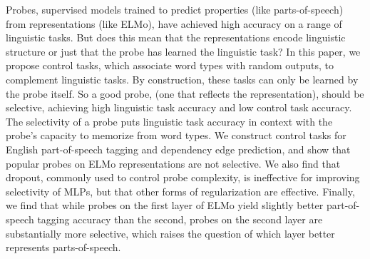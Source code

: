 Probes, supervised models trained to predict properties (like parts-of-speech) from representations (like ELMo), have achieved high accuracy on a range of linguistic tasks. But does this mean that the representations encode linguistic structure or just that the probe has learned the linguistic task? In this paper, we propose control tasks, which associate word types with random outputs, to complement linguistic tasks. By construction, these tasks can only be learned by the probe itself. So a good probe, (one that reflects the representation), should be selective, achieving high linguistic task accuracy and low control task accuracy. The selectivity of a probe puts linguistic task accuracy in context with the probe's capacity to memorize from word types. We construct control tasks for English part-of-speech tagging and dependency edge prediction, and show that popular probes on ELMo representations are not selective. We also find that dropout, commonly used to control probe complexity, is ineffective for improving selectivity of MLPs, but that other forms of regularization are effective. Finally, we find that while probes on the first layer of ELMo yield slightly better part-of-speech tagging accuracy than the second, probes on the second layer are substantially more selective, which raises the question of which layer better represents parts-of-speech.